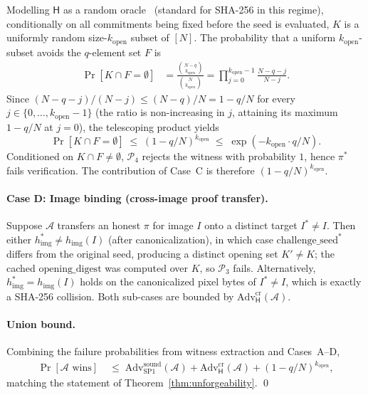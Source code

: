 \documentclass{article}
\theoremstyle{plain}
\theoremstyle{definition}
\theoremstyle{remark}
\begin{document}
Modelling $\mathsf{H}$ as a random oracle~\cite{bellare1993rom} (standard for SHA-256 in this regime), conditionally on all commitments being fixed before the seed is evaluated, $K$ is a uniformly random size-$k_{\mathrm{open}}$ subset of $[N]$. The probability that a uniform $k_{\mathrm{open}}$-subset avoids the $q$-element set $F$ is
\begin{align*}
\Pr[K \cap F = \emptyset] &= \frac{\binom{N-q}{k_{\mathrm{open}}}}{\binom{N}{k_{\mathrm{open}}}}
= \prod_{j=0}^{k_{\mathrm{open}}-1} \frac{N - q - j}{N - j}.
\end{align*}
Since $(N-q-j)/(N-j) \leq (N-q)/N = 1 - q/N$ for every $j \in \{0, \dots, k_{\mathrm{open}}-1\}$ (the ratio is non-increasing in $j$, attaining its maximum $1-q/N$ at $j=0$), the telescoping product yields
\[
\Pr[K \cap F = \emptyset] \;\leq\; (1 - q/N)^{k_{\mathrm{open}}} \;\leq\; \exp\!\left(-k_{\mathrm{open}}\cdot q / N\right).
\]
Conditioned on $K \cap F \neq \emptyset$, $\mathcal{P}_4$ rejects the witness with probability $1$, hence $\pi^*$ fails verification. The contribution of Case~C is therefore $(1 - q/N)^{k_{\mathrm{open}}}$.

\paragraph{Case D: Image binding (cross-image proof transfer).} Suppose $\mathcal{A}$ transfers an honest $\pi$ for image $I$ onto a distinct target $I^* \neq I$. Then either $h_{\mathrm{img}}^* \neq h_{\mathrm{img}}(I)$ (after canonicalization), in which case $\mathrm{challenge\_seed}^*$ differs from the original seed, producing a distinct opening set $K' \neq K$; the cached $\mathrm{opening\_digest}$ was computed over $K$, so $\mathcal{P}_3$ fails. Alternatively, $h_{\mathrm{img}}^* = h_{\mathrm{img}}(I)$ holds on the canonicalized pixel bytes of $I^* \neq I$, which is exactly a SHA-256 collision. Both sub-cases are bounded by $\mathrm{Adv}^{\mathrm{cr}}_{\mathsf{H}}(\mathcal{A})$.

\paragraph{Union bound.} Combining the failure probabilities from witness extraction and Cases~A--D,
\begin{align*}
\Pr[\mathcal{A}\text{ wins}] \;&\leq\; \mathrm{Adv}^{\mathrm{sound}}_{\mathrm{SP1}}(\mathcal{A}) + \mathrm{Adv}^{\mathrm{cr}}_{\mathsf{H}}(\mathcal{A}) + (1 - q/N)^{k_{\mathrm{open}}},
\end{align*}
matching the statement of Theorem~\ref{thm:unforgeability}. \qed
\end{document}
